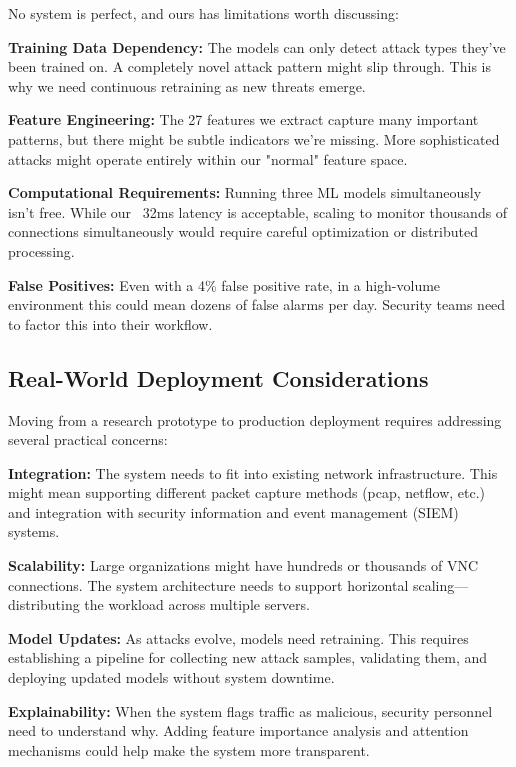 \documentclass[conference]{IEEEtran}
\begin{document}
No system is perfect, and ours has limitations worth discussing:

\textbf{Training Data Dependency:} The models can only detect attack types they've been trained on. A completely novel attack pattern might slip through. This is why we need continuous retraining as new threats emerge.

\textbf{Feature Engineering:} The 27 features we extract capture many important patterns, but there might be subtle indicators we're missing. More sophisticated attacks might operate entirely within our "normal" feature space.

\textbf{Computational Requirements:} Running three ML models simultaneously isn't free. While our ~32ms latency is acceptable, scaling to monitor thousands of connections simultaneously would require careful optimization or distributed processing.

\textbf{False Positives:} Even with a 4\% false positive rate, in a high-volume environment this could mean dozens of false alarms per day. Security teams need to factor this into their workflow.

\subsection{Real-World Deployment Considerations}

Moving from a research prototype to production deployment requires addressing several practical concerns:

\textbf{Integration:} The system needs to fit into existing network infrastructure. This might mean supporting different packet capture methods (pcap, netflow, etc.) and integration with security information and event management (SIEM) systems.

\textbf{Scalability:} Large organizations might have hundreds or thousands of VNC connections. The system architecture needs to support horizontal scaling—distributing the workload across multiple servers.

\textbf{Model Updates:} As attacks evolve, models need retraining. This requires establishing a pipeline for collecting new attack samples, validating them, and deploying updated models without system downtime.

\textbf{Explainability:} When the system flags traffic as malicious, security personnel need to understand why. Adding feature importance analysis and attention mechanisms could help make the system more transparent.
\end{document}
